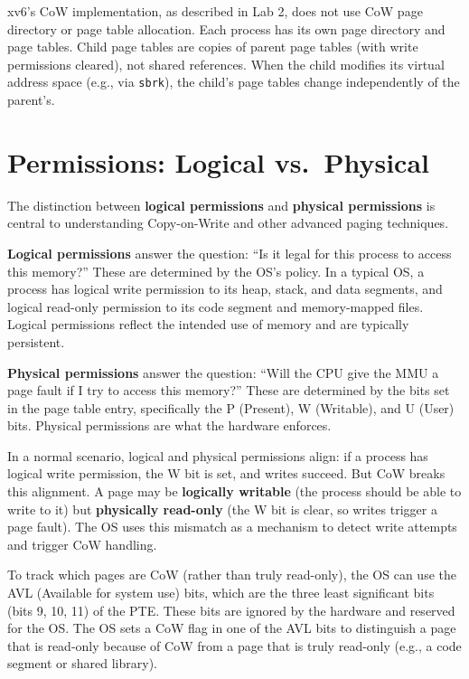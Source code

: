 \documentclass[11pt]{article}
\begin{document}
xv6's CoW implementation, as described in Lab 2, does not use CoW page directory or page table allocation. Each process has its own page directory and page tables. Child page tables are copies of parent page tables (with write permissions cleared), not shared references. When the child modifies its virtual address space (e.g., via \texttt{sbrk}), the child's page tables change independently of the parent's.

\section{Permissions: Logical vs.\ Physical}

The distinction between \textbf{logical permissions} and \textbf{physical permissions} is central to understanding Copy-on-Write and other advanced paging techniques.

\textbf{Logical permissions} answer the question: ``Is it legal for this process to access this memory?'' These are determined by the OS's policy. In a typical OS, a process has logical write permission to its heap, stack, and data segments, and logical read-only permission to its code segment and memory-mapped files. Logical permissions reflect the intended use of memory and are typically persistent.

\textbf{Physical permissions} answer the question: ``Will the CPU give the MMU a page fault if I try to access this memory?'' These are determined by the bits set in the page table entry, specifically the P (Present), W (Writable), and U (User) bits. Physical permissions are what the hardware enforces.

In a normal scenario, logical and physical permissions align: if a process has logical write permission, the W bit is set, and writes succeed. But CoW breaks this alignment. A page may be \textbf{logically writable} (the process should be able to write to it) but \textbf{physically read-only} (the W bit is clear, so writes trigger a page fault). The OS uses this mismatch as a mechanism to detect write attempts and trigger CoW handling.

To track which pages are CoW (rather than truly read-only), the OS can use the AVL (Available for system use) bits, which are the three least significant bits (bits 9, 10, 11) of the PTE. These bits are ignored by the hardware and reserved for the OS. The OS sets a CoW flag in one of the AVL bits to distinguish a page that is read-only because of CoW from a page that is truly read-only (e.g., a code segment or shared library).
\end{document}
